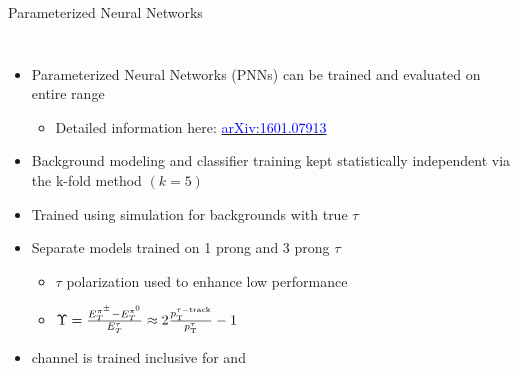 \documentclass[aspectratio=169,xcolor=table]{beamer}
\begin{document}
    \begin{frame}[t]{Parameterized Neural Networks}
      \begin{columns}[t]
      \begin{itemize}
      \small
      \item Parameterized Neural Networks (PNNs) can be trained and evaluated on entire \mHpm range
      \begin{itemize}
        \item Detailed information here: \href{https://arxiv.org/abs/1601.07913}{\textcolor{blue}{arXiv:1601.07913}}
      \end{itemize}
      \item Background modeling and classifier training kept statistically independent via the k-fold method $(k=5)$
      \item Trained using simulation for backgrounds with true $\tau$
      \item Separate models trained on 1 prong and 3 prong $\tau$
      \begin{itemize}
        \item $\tau$ polarization used to enhance low \mHpm performance
        \item $\Upsilon = \frac{ E^{\pi^{\pm}}_{T} - E^{\pi^{0}}_{T}}{E^{\tau}_{T}} \approx 2 \frac{p_{\text{T}}^{\tau-\mathrm{track}}}{p_{\text{T}}^{\tau}} -1$
      \end{itemize}
      \item \taulep channel is trained inclusive for \tauel and \taumu

\end{itemize}
\end{columns}
\end{frame}
\end{document}
